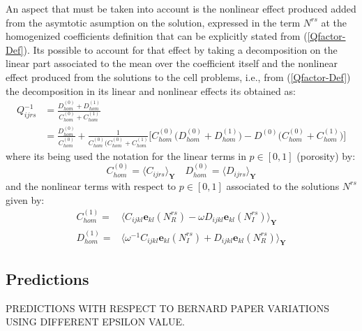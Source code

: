 An aspect that must be taken into account is the nonlinear effect produced added from the asymtotic asumption on the solution, expressed in the term $N^{rs}$ at the homogenized coefficients definition that can be explicitly stated from (\ref{Qfactor-Def}).
Its possible to account for that effect by taking a decomposition on the linear part associated to the mean over the coefficient itself and the nonlinear effect produced from the solutions to the cell problems, i.e., from (\ref{Qfactor-Def}) the decomposition in its linear and nonlinear effects its obtained as:
\begin{equation}
    \label{Expansion-Qfactor}
    \begin{aligned}
        Q_{ijrs}^{-1}  & = \frac{D_{hom}^{(0)} + D_{hom}^{(1)}}{C_{hom}^{(0)} + C_{hom}^{(1)}}  \\
         & =  \frac{D_{hom}^{(0)}}{C_{hom}^{(0)}} + \frac{1}{C^{(0)}_{hom}( C^{(0)}_{hom} + C^{(1)}_{hom}} \big[C^{(0)}_{hom} \big( D^{(0)}_{hom} + D^{(1)}_{hom}\big) - D^{(0)}\big( C^{(0)}_{hom} + C^{(1)}_{hom} \big) \big]
    \end{aligned}
\end{equation}
where its being used the notation for the linear terms in $p \in [0,1]$ (porosity) by:
\begin{equation*}
    C^{(0)}_{hom} = \langle C_{ijrs} \rangle_{\mathbf{Y}} \quad  D^{(0)}_{hom} = \langle D_{ijrs} \rangle_{\mathbf{Y}}
\end{equation*}
and the nonlinear terms with respect to $p \in [0,1]$ associated to the solutions $N^{rs}$ given by:
\begin{equation*}
    \begin{array}{cc}
        C^{(1)}_{hom} =& \langle C_{ijkl}\mathbf{e}_{kl}(N^{rs}_R) - \omega D_{ijkl}\mathbf{e}_{kl}(N^{rs}_I) \rangle_{\mathbf{Y}} \\
        D^{(1)}_{hom} =& \langle \omega^{-1} C_{ijkl}\mathbf{e}_{kl}(N^{rs}_I) + D_{ijkl}\mathbf{e}_{kl}(N^{rs}_R) \rangle_{\mathbf{Y}} 
    \end{array}
\end{equation*}

\subsection{Predictions}

PREDICTIONS WITH RESPECT TO BERNARD PAPER
VARIATIONS USING DIFFERENT EPSILON VALUE.

